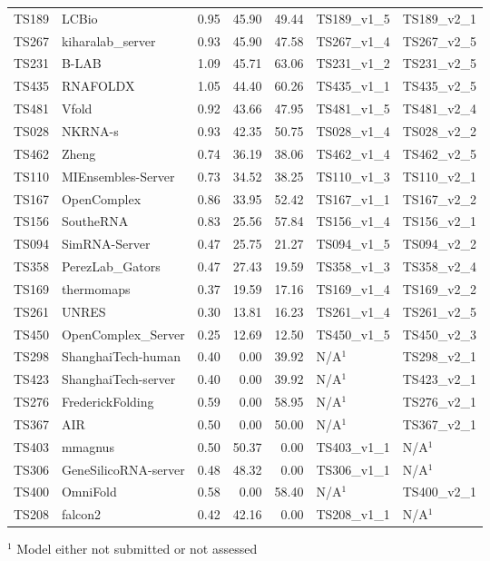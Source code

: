 \begin{table}[ht]
{\begin{tabular}{llrrrll}
TS189 & LCBio & 0.95 & 45.90 & 49.44 & TS189\_v1\_5 & TS189\_v2\_1 \\ 
TS267 & kiharalab\_server & 0.93 & 45.90 & 47.58 & TS267\_v1\_4 & TS267\_v2\_5 \\ 
TS231 & B-LAB & 1.09 & 45.71 & 63.06 & TS231\_v1\_2 & TS231\_v2\_5 \\ 
TS435 & RNAFOLDX & 1.05 & 44.40 & 60.26 & TS435\_v1\_1 & TS435\_v2\_5 \\ 
TS481 & Vfold & 0.92 & 43.66 & 47.95 & TS481\_v1\_5 & TS481\_v2\_4 \\ 
TS028 & NKRNA-s & 0.93 & 42.35 & 50.75 & TS028\_v1\_4 & TS028\_v2\_2 \\ 
TS462 & Zheng & 0.74 & 36.19 & 38.06 & TS462\_v1\_4 & TS462\_v2\_5 \\ 
TS110 & MIEnsembles-Server & 0.73 & 34.52 & 38.25 & TS110\_v1\_3 & TS110\_v2\_1 \\ 
TS167 & OpenComplex & 0.86 & 33.95 & 52.42 & TS167\_v1\_1 & TS167\_v2\_2 \\ 
TS156 & SoutheRNA & 0.83 & 25.56 & 57.84 & TS156\_v1\_4 & TS156\_v2\_1 \\ 
TS094 & SimRNA-Server & 0.47 & 25.75 & 21.27 & TS094\_v1\_5 & TS094\_v2\_2 \\ 
TS358 & PerezLab\_Gators & 0.47 & 27.43 & 19.59 & TS358\_v1\_3 & TS358\_v2\_4 \\ 
TS169 & thermomaps & 0.37 & 19.59 & 17.16 & TS169\_v1\_4 & TS169\_v2\_2 \\ 
TS261 & UNRES & 0.30 & 13.81 & 16.23 & TS261\_v1\_4 & TS261\_v2\_5 \\ 
TS450 & OpenComplex\_Server & 0.25 & 12.69 & 12.50 & TS450\_v1\_5 & TS450\_v2\_3 \\ 
TS298 & ShanghaiTech-human & 0.40 & 0.00 & 39.92 & N/A$^{1}$ & TS298\_v2\_1 \\ 
TS423 & ShanghaiTech-server & 0.40 & 0.00 & 39.92 & N/A$^{1}$ & TS423\_v2\_1 \\ 
TS276 & FrederickFolding & 0.59 & 0.00 & 58.95 & N/A$^{1}$ & TS276\_v2\_1 \\ 
TS367 & AIR & 0.50 & 0.00 & 50.00 & N/A$^{1}$ & TS367\_v2\_1 \\ 
TS403 & mmagnus & 0.50 & 50.37 & 0.00 & TS403\_v1\_1 & N/A$^{1}$ \\ 
TS306 & GeneSilicoRNA-server & 0.48 & 48.32 & 0.00 & TS306\_v1\_1 & N/A$^{1}$ \\ 
TS400 & OmniFold & 0.58 & 0.00 & 58.40 & N/A$^{1}$ & TS400\_v2\_1 \\ 
TS208 & falcon2 & 0.42 & 42.16 & 0.00 & TS208\_v1\_1 & N/A$^{1}$ \\ 
\bottomrule
\end{tabular}%
}
\begin{flushleft}\footnotesize $^{1}$ Model either not submitted or not assessed\end{flushleft}
\end{table}
